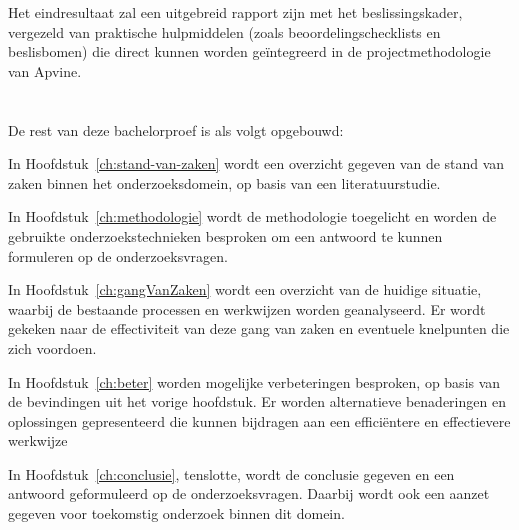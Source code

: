 Het eindresultaat zal een uitgebreid rapport zijn met het beslissingskader, vergezeld van praktische hulpmiddelen (zoals beoordelingschecklists en beslisbomen) die direct kunnen worden geïntegreerd in de projectmethodologie van Apvine.

\section{}%
\label{sec:opzet-bachelorproef}


De rest van deze bachelorproef is als volgt opgebouwd:

In Hoofdstuk~\ref{ch:stand-van-zaken} wordt een overzicht gegeven van de stand van zaken binnen het onderzoeksdomein, op basis van een literatuurstudie.

In Hoofdstuk~\ref{ch:methodologie} wordt de methodologie toegelicht en worden de gebruikte onderzoekstechnieken besproken om een antwoord te kunnen formuleren op de onderzoeksvragen.


In Hoofdstuk~\ref{ch:gangVanZaken} wordt een overzicht van de huidige situatie, waarbij de bestaande processen en werkwijzen worden geanalyseerd. Er wordt gekeken naar de effectiviteit van deze gang van zaken en eventuele knelpunten die zich voordoen.

In Hoofdstuk~\ref{ch:beter} worden mogelijke verbeteringen besproken, op basis van de bevindingen uit het vorige hoofdstuk. Er worden alternatieve benaderingen en oplossingen gepresenteerd die kunnen bijdragen aan een efficiëntere en effectievere werkwijze

In Hoofdstuk~\ref{ch:conclusie}, tenslotte, wordt de conclusie gegeven en een antwoord geformuleerd op de onderzoeksvragen. Daarbij wordt ook een aanzet gegeven voor toekomstig onderzoek binnen dit domein.